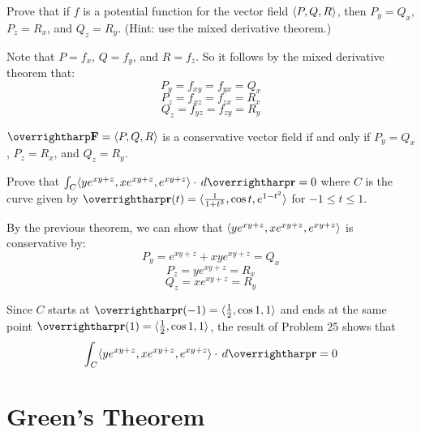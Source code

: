 \documentclass[letterpaper, twoside, 12pt]{book}
\begin{document}
          \begin{problem}
            Prove that if $f$ is a potential function for the vector field
            $\langle P,Q,R\rangle$, then
            $P_y=Q_x$, $P_z=R_x$, and $Q_z=R_y$. (Hint: use the mixed derivative
            theorem.)
          \end{problem}

          \begin{solution}
            Note that \(P=f_x\), \(Q=f_y\), and \(R=f_z\). So it follows
            by the mixed derivative theorem that:
              \[
                P_y=f_{xy}=f_{yx}=Q_x
              \]
              \[
                P_z=f_{xz}=f_{zx}=R_x
              \]
              \[
                Q_z=f_{yz}=f_{zy}=R_y
              \]
          \end{solution}

\begin{theorem}
  $\vect{F}=\<P,Q,R\>$ is a conservative vector field if and only if
  $P_y=Q_x$, $P_z=R_x$, and $Q_z=R_y$.
\end{theorem}

          \begin{problem}
            Prove that
            $\int_C\<ye^{xy+z},xe^{xy+z},e^{xy+z}\>\cdot\dvar{\vect r}=0$
            where $C$ is the curve given by
            $\vect{r}(t)=\<\frac{1}{1+t^2},\cos t,e^{1-t^2}\>$
            for $-1 \leq t \leq 1$.
          \end{problem}

          \begin{solution}
            By the previous theorem, we can show that
            \(\langle ye^{xy+z},xe^{xy+z},e^{xy+z}\rangle\) is conservative by:
              \[
                P_y=e^{xy+z}+xye^{xy+z}=Q_x
              \]
              \[
                P_z=ye^{xy+z}=R_x
              \]
              \[
                Q_z=xe^{xy+z}=R_y
              \]

            Since \(C\) starts at \(\vect{r}(-1)=\<\frac{1}{2},\cos 1,1\>\)
            and ends at the same point
            \(\vect{r}(1)=\<\frac{1}{2},\cos 1,1\>\), the result of
            Problem 25 shows that
              \[
                \int_C\<ye^{xy+z},xe^{xy+z},e^{xy+z}\>\cdot\dvar{\vect r}=0
              \]
          \end{solution}


\section{Green's Theorem} %
\end{document}
